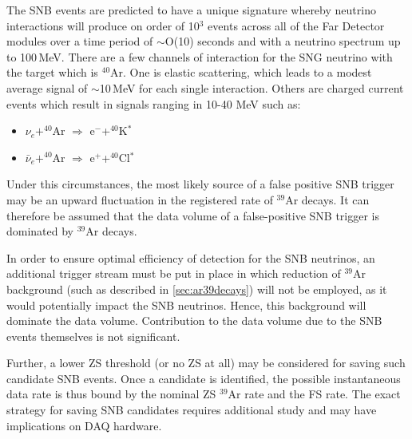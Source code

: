 The SNB events are predicted to have a unique signature whereby
neutrino interactions will produce on order of 10$^3$ events across
all of the Far Detector modules over a time period of $\sim$O(10) seconds and with a
neutrino spectrum up to 100\,MeV. There are a few channels of interaction
for the SNG neutrino with the target which is $^{40}$Ar. One is elastic
scattering, which  leads to a modest average signal of $\sim$10\,MeV for
each single interaction. Others are charged current events which result in signals
ranging in 10-40 MeV such as:
\begin{itemize}

\item $\nu_e+^{40}$Ar $\Rightarrow$ e$^-$+$^{40}$K$^*$

\item $\bar{\nu}_e+^{40}$Ar $\Rightarrow$ e$^+$+$^{40}$Cl$^*$

\end{itemize}

Under this circumstances, 
the most likely source of a false positive SNB trigger may be an upward
fluctuation in the registered rate of $^{39}$Ar decays.
It can therefore be assumed that the data volume of a
false-positive SNB trigger is dominated by $^{39}$Ar decays.

In order to ensure optimal efficiency of detection for the SNB neutrinos,
an  additional trigger stream must be put in place in which
reduction of $^{39}$Ar background (such as described in \ref{sec:ar39decays}) will not be employed,
as it would potentially impact the SNB neutrinos. Hence, this background 
will dominate the data volume. Contribution to the data volume due to the SNB events
themselves is not significant.

Further, a lower ZS threshold (or no ZS at all) may be considered for saving such candidate SNB events.
Once a candidate is identified, the possible instantaneous data rate is thus bound by the nominal
ZS $^{39}$Ar rate and the FS rate. The exact strategy for saving SNB candidates requires additional study
and may have implications on DAQ hardware.

